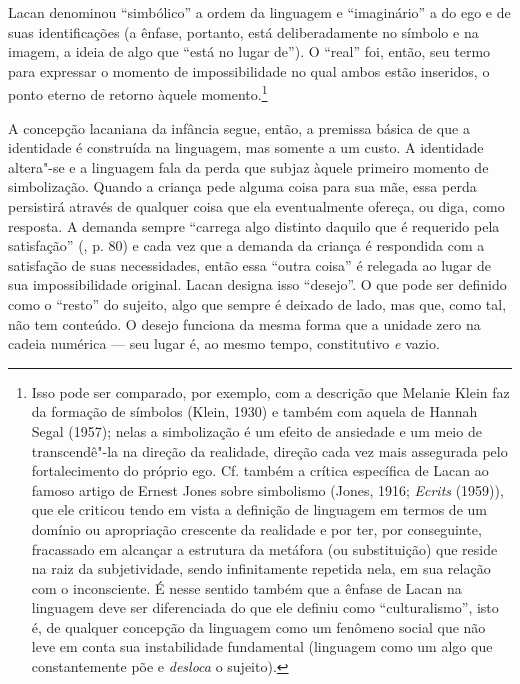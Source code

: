 Lacan denominou ``simbólico'' a ordem da linguagem e ``imaginário'' a do
ego e de suas identificações (a ênfase, portanto, está deliberadamente
no símbolo e na imagem, a ideia de algo que ``está no lugar de''). O
``real'' foi, então, seu termo para expressar o momento de
impossibilidade no qual ambos estão inseridos, o ponto eterno de retorno
àquele momento.\footnote{Isso pode ser comparado, por exemplo, com a
  descrição que Melanie Klein faz da formação de símbolos (Klein, 1930)
  e também com aquela de Hannah Segal (1957); nelas a simbolização é um
  efeito de ansiedade e um meio de transcendê"-la na direção da
  realidade, direção cada vez mais assegurada pelo fortalecimento do
  próprio ego. Cf. também a crítica específica de Lacan ao famoso artigo
  de Ernest Jones sobre simbolismo (Jones, 1916; \emph{Ecrits} (1959)),
  que ele criticou tendo em vista a definição de linguagem em termos de
  um domínio ou apropriação crescente da realidade e por ter, por
  conseguinte, fracassado em alcançar a estrutura da metáfora (ou
  substituição) que reside na raiz da subjetividade, sendo infinitamente
  repetida nela, em sua relação com o inconsciente. É nesse sentido
  também que a ênfase de Lacan na linguagem deve ser diferenciada do que
  ele definiu como ``culturalismo'', isto é, de qualquer concepção da
  linguagem como um fenômeno social que não leve em conta sua
  instabilidade fundamental (linguagem como um algo que constantemente
  põe e \emph{desloca} o sujeito).}

A concepção lacaniana da infância segue, então, a premissa básica de que
a identidade é construída na linguagem, mas somente a um custo. A
identidade altera"-se e a linguagem fala da perda que subjaz àquele
primeiro momento de simbolização. Quando a criança pede alguma coisa
para sua mãe, essa perda persistirá através de qualquer coisa que ela
eventualmente ofereça, ou diga, como resposta. A demanda sempre
``carrega algo distinto daquilo que é requerido pela satisfação'' (,
p. 80) e cada vez que a demanda da criança é respondida com a satisfação
de suas necessidades, então essa ``outra coisa'' é relegada ao lugar de
sua impossibilidade original. Lacan designa isso ``desejo''. O que pode
ser definido como o ``resto'' do sujeito, algo que sempre é deixado de
lado, mas que, como tal, não tem conteúdo. O desejo funciona da mesma
forma que a unidade zero na cadeia numérica --- seu lugar é, ao mesmo
tempo, constitutivo \emph{e} vazio.

